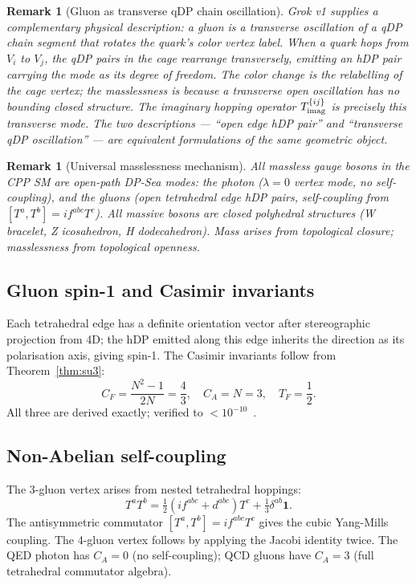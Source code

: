 \documentclass[11pt,a4paper]{article}
\newtheorem{remark}[theorem]{Remark}
\begin{document}
\begin{remark}[Gluon as transverse qDP chain oscillation]
\label{rem:gluon_transverse}
Grok v1 supplies a complementary physical description: a gluon is
a \emph{transverse oscillation of a qDP chain segment that rotates
the quark's color vertex label}.  When a quark hops from $V_i$ to
$V_j$, the qDP pairs in the cage rearrange transversely, emitting
an hDP pair carrying the mode as its degree of freedom.  The color
change is the relabelling of the cage vertex; the masslessness is
because a transverse open oscillation has no bounding closed
structure.  The imaginary hopping operator $T^{\{ij\}}_{\rm imag}$
is precisely this transverse mode.  The two descriptions --- ``open
edge hDP pair'' and ``transverse qDP oscillation'' --- are
equivalent formulations of the same geometric object.
\end{remark}

\begin{remark}[Universal masslessness mechanism]
All massless gauge bosons in the CPP SM are open-path DP-Sea modes:
the photon ($\lambda=0$ vertex mode, no self-coupling), and the
gluons (open tetrahedral edge hDP pairs, self-coupling from
$[T^a,T^b]=if^{abc}T^c$).  All massive bosons are closed polyhedral
structures (W bracelet, Z icosahedron, H dodecahedron).  Mass arises
from topological closure; masslessness from topological openness.
\end{remark}

\subsection{Gluon spin-1 and Casimir invariants}

Each tetrahedral edge has a definite orientation vector after
stereographic projection from 4D; the hDP emitted along this edge
inherits the direction as its polarisation axis, giving spin-1.
The Casimir invariants follow from Theorem~\ref{thm:su3}:
\begin{equation}
C_F = \frac{N^2-1}{2N} = \frac{4}{3},\quad
C_A = N = 3,\quad
T_F = \frac{1}{2}.
\label{eq:casimirs}
\end{equation}
All three are derived exactly; verified to $<10^{-10}$~\citep{cpp_ss_mc}.

\subsection{Non-Abelian self-coupling}

The 3-gluon vertex arises from nested tetrahedral hoppings:
\begin{equation}
T^aT^b = \tfrac{1}{2}(if^{abc}+d^{abc})T^c + \tfrac{1}{3}\delta^{ab}\mathbf{1}.
\label{eq:TaTb}
\end{equation}
The antisymmetric commutator $[T^a,T^b] = if^{abc}T^c$ gives the
cubic Yang-Mills coupling.  The 4-gluon vertex follows by applying
the Jacobi identity twice.  The QED photon has $C_A = 0$ (no
self-coupling); QCD gluons have $C_A = 3$ (full tetrahedral
commutator algebra).
\end{document}
